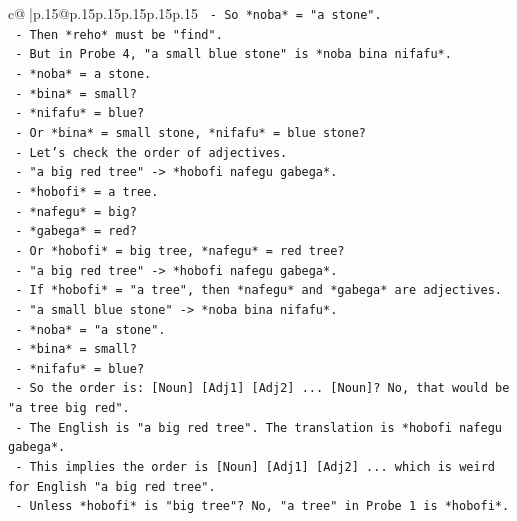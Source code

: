 \documentclass{article}
\begin{document}
{\begin{supertabular}{c@{$\;$}|p{.15\linewidth}@{}p{.15\linewidth}p{.15\linewidth}p{.15\linewidth}p{.15\linewidth}p{.15\linewidth}}
{{{\texttt{              {-} So *noba* = "a stone".} \\
\texttt{              {-} Then *reho* must be "find".} \\
\texttt{              {-} But in Probe 4, "a small blue stone" is *noba bina nifafu*.} \\
\texttt{                {-} *noba* = a stone.} \\
\texttt{                {-} *bina* = small?} \\
\texttt{                {-} *nifafu* = blue?} \\
\texttt{                {-} Or *bina* = small stone, *nifafu* = blue stone?} \\
\texttt{                {-} Let's check the order of adjectives.} \\
\texttt{                {-} "a big red tree" {-}> *hobofi nafegu gabega*.} \\
\texttt{                  {-} *hobofi* = a tree.} \\
\texttt{                  {-} *nafegu* = big?} \\
\texttt{                  {-} *gabega* = red?} \\
\texttt{                  {-} Or *hobofi* = big tree, *nafegu* = red tree?} \\
\texttt{                  {-} "a big red tree" {-}> *hobofi nafegu gabega*.} \\
\texttt{                  {-} If *hobofi* = "a tree", then *nafegu* and *gabega* are adjectives.} \\
\texttt{                  {-} "a small blue stone" {-}> *noba bina nifafu*.} \\
\texttt{                    {-} *noba* = "a stone".} \\
\texttt{                    {-} *bina* = small?} \\
\texttt{                    {-} *nifafu* = blue?} \\
\texttt{                  {-} So the order is: {[}Noun{]} {[}Adj1{]} {[}Adj2{]} ... {[}Noun{]}? No, that would be "a tree big red".} \\
\texttt{                  {-} The English is "a big red tree". The translation is *hobofi nafegu gabega*.} \\
\texttt{                  {-} This implies the order is {[}Noun{]} {[}Adj1{]} {[}Adj2{]} ... which is weird for English "a big red tree".} \\
\texttt{                  {-} Unless *hobofi* is "big tree"? No, "a tree" in Probe 1 is *hobofi*.} \\
}}}
\end{supertabular}}
\end{document}
